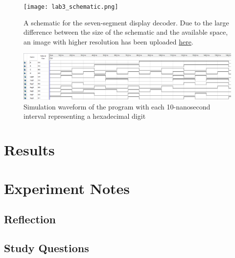 \documentclass[12pt]{article}
\begin{document}
\begin{figure}[h]
  \centering
  \texttt{[image: lab3\_schematic.png]}
  \caption{A schematic for the seven-segment display decoder. Due to the large difference between the size of the schematic and the available space, an image with higher resolution has been uploaded \href{https://i.imgur.com/jaLoZg9.jpg}{here}.}
  \label{figure:3}
\end{figure}

\begin{figure}[h]
  \centering
  \includegraphics[width=\textwidth]{lab3_simulation.png}
  \caption{Simulation waveform of the program with each 10-nanosecond interval representing a hexadecimal digit}
  \label{figure:4}
\end{figure}



\section{Results}

\section{Experiment Notes}

\subsection*{Reflection}

\subsection*{Study Questions}
\end{document}
